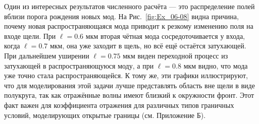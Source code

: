 Один из интересных результатов численного расчёта --- это распределение полей вблизи порога рождения новых мод. На Рис.~\ref{fig:Ex_06-08} видна причина, почему новая распространяющаяся мода приводит к резкому изменению поля на входе щели. При $\ell = 0.6$ мкм вторая чётная мода сосредоточивается у входа, когда $\ell = 0.7$ мкм, она уже заходит в щель, но всё ещё остаётся затухающей. При дальнейшем уширении $\ell=0.75$ мкм виден переходной процесс из затухающей в распространяющуюся моду, а при $\ell = 0.8$ мкм видно, что мода уже точно стала распространяющейся. К тому же, эти графики иллюстрируют, что для моделирования этой задачи лучше представлять область вне щели в виде полукруга, так как отражённые волны имеют близкий к окружности фронт. Этот факт важен для коэффициента отражения для различных типов граничных условий, моделирующих открытые границы (см. Приложение Б).  
